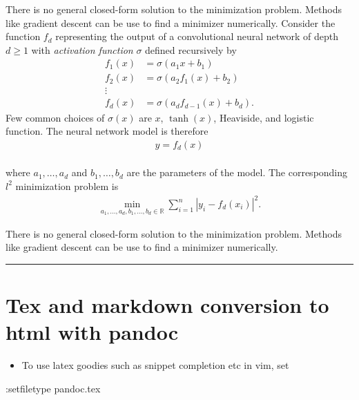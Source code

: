 \documentclass[
]{article}
\newenvironment{Shaded}{}{}
\newcommand{\NormalTok}[1]{#1}
\providecommand{\tightlist}{%
  \setlength{\itemsep}{0pt}\setlength{\parskip}{0pt}}
\begin{document}
There is no general closed-form solution to the minimization problem.
Methods like gradient descent can be use to find a minimizer
numerically. Consider the function \(f_d\) representing the output of a
convolutional neural network of depth \(d \ge 1\) with \emph{activation
function} \(\sigma\) defined recursively by \begin{align*}
    f_1(x) &= \sigma(a_1 x + b_1)
    \\
    f_2(x) &= \sigma(a_2 f_1(x) + b_2)
    \\
    \vdots
    \\
    f_d(x) &= \sigma(a_d f_{d-1}(x) + b_d).
\end{align*} Few common choices of \(\sigma(x)\) are \(x\),
\(\tanh(x)\), Heaviside, and logistic function. The neural network model
is therefore \begin{align*}
    y = f_d(x)
\end{align*}\\
where \(a_1, \dots, a_d\) and \(b_1, \dots, b_d\) are the parameters of
the model. The corresponding \(l^2\) minimization problem is
\begin{align*}
    \min_{a_1, \dots, a_d, b_1, \dots, b_d \in \mathbb{R}} \sum_{i=1}^{n} \left\lvert y_i - f_d(x_i)\right\rvert^2.
\end{align*}

There is no general closed-form solution to the minimization problem.
Methods like gradient descent can be use to find a minimizer
numerically.

\begin{center}\rule{0.5\linewidth}{0.5pt}\end{center}

\hypertarget{tex-and-markdown-conversion-to-html-with-pandoc}{%
\section{Tex and markdown conversion to html with
pandoc}\label{tex-and-markdown-conversion-to-html-with-pandoc}}

\begin{itemize}
\tightlist
\item
  To use latex goodies such as snippet completion etc in vim, set
\end{itemize}

\begin{Shaded}
\begin{Highlighting}[]
\NormalTok{:setfiletype pandoc.tex}
\end{Highlighting}
\end{Shaded}
\end{document}
